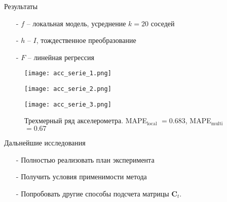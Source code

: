 \documentclass{beamer}
\begin{document}
\begin{frame}{Результаты}
\begin{itemize}
\item[-] $f$ -- локальная модель, усреднение $k = 20$ соседей
\item[-] $h$ -- $I$, тождественное преобразование
\item[-] $F$ -- линейная регрессия
\end{itemize}

\begin{figure}[h]
  \begin{minipage}{0.45\textwidth}
    \texttt{[image: acc\_serie\_1.png]}
  
  \end{minipage}\hfill
  \begin{minipage}{0.45\textwidth}
    \texttt{[image: acc\_serie\_2.png]}
  
  \end{minipage}\hfill
\end{figure}

\begin{figure}[h]
  \begin{minipage}{0.45\textwidth}
    \texttt{[image: acc\_serie\_3.png]}
  
  \end{minipage}\hfill
  \caption*{Трехмерный ряд акселерометра. MAPE$_{\text{local}}$ $= 0.683$, MAPE$_{\text{multi}}$ $= 0.67$}
\end{figure}


\end{frame}
\begin{frame}{Дальнейшие исследования}
\begin{itemize}
\item[-] Полностью реализовать план эксперимента
\item[-] Получить условия применимости метода
\item[-] Попробовать другие способы подсчета матрицы $\mathbf{C}_t$.
\end{itemize}


\end{frame}
\end{document}
